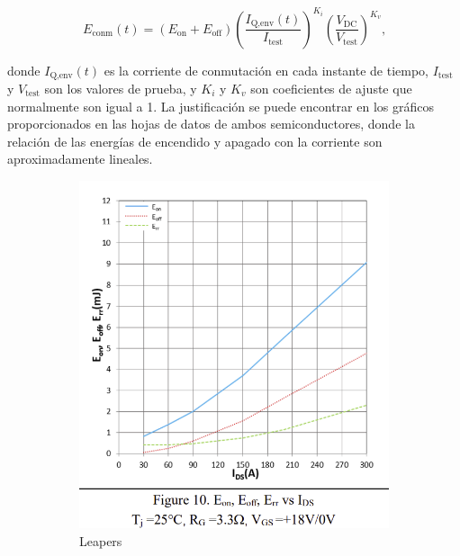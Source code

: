 \begin{equation}
E_{\text{conm}}(t) = (E_{\text{on}} + E_{\text{off}}) \left( \frac{I_{\text{Q,env}}(t)}{I_{\text{test}}} \right)^{K_i} \left( \frac{V_{\text{DC}}}{V_{\text{test}}} \right)^{K_v} \text{,}
\end{equation}

donde \(I_{\text{Q,env}}(t)\) es la corriente de conmutación en cada instante de tiempo, \(I_{\text{test}}\) y \(V_{\text{test}}\) son los valores de prueba, y \(K_i\) y \(K_v\) son coeficientes de ajuste que normalmente son igual a 1. La justificación se puede encontrar en los gráficos proporcionados en las hojas de datos de ambos semiconductores, donde la relación de las energías de encendido y apagado con la corriente son aproximadamente lineales.

\begin{figure}[H]
	\centering
	\begin{subfigure}[b]{0.4\linewidth}
		\centering
		\includegraphics[width=\linewidth]{fig/eoneoffleapers}
		\caption{Leapers}
	\end{subfigure}
	\hfill
	\begin{subfigure}[b]{0.55\linewidth}
		\centering

\end{subfigure}
\end{figure}
